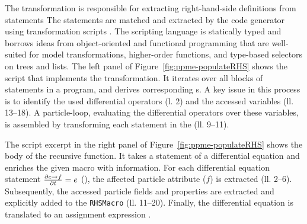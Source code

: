 The  transformation is responsible for extracting
right-hand-side definitions from  statements 
%
The  statements are matched and extracted by the code generator using transformation scripts .
The scripting language is statically typed and borrows ideas from object-oriented and functional programming that are well-suited for model transformations, 
higher-order functions, and type-based selectors on trees and lists.  
%
The left panel 
of Figure~\ref{fig:ppme-populateRHS} shows the script that implements the  transformation. 
It iterates over all blocks of  statements in a
program, and derives corresponding s. A key issue in this process is to identify the used
differential operators   (l. 2) and the accessed variables (ll. 13--18). 
A  particle-loop, evaluating the differential operators over these variables, is assembled by transforming each statement in
the   (ll. 9--11). 

The script excerpt in the right panel of Figure~\ref{fig:ppme-populateRHS} shows the body
of the recursive  function. It takes a statement of a
differential equation and enriches the given macro with information. For each
differential equation statement $\frac{\partial c{\to}f}{\partial{t}} = e$
(), the affected particle attribute ($f$) is extracted (ll. 2--6).
Subsequently, the accessed particle fields and properties are extracted and explicitly
added to the \texttt{RHSMacro} (ll. 11--20). Finally, the differential equation is
translated to an assignment expression .

